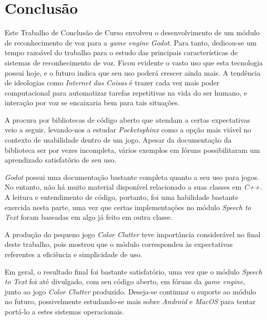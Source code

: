\chapter{Conclusão}
\label{cap:conclusion}

Este Trabalho de Conclusão de Curso envolveu o desenvolvimento de um módulo de reconhecimento de voz para a \textit{game engine} \textit{Godot}. Para tanto, dedicou-se um tempo razoável do trabalho para o estudo das principais características de sistemas de reconhecimento de voz. Ficou evidente o vasto uso que esta tecnologia possui hoje, e o futuro indica que seu uso poderá crescer ainda mais. A tendência de ideologias como \emph{Internet das Coisas} é trazer cada vez mais poder computacional para automatizar tarefas repetitivas na vida do ser humano, e interação por voz se encaixaria bem para tais situações.

A procura por bibliotecas de código aberto que atendam a certas expectativas veio a seguir, levando-nos a estudar \textit{Pocketsphinx} como a opção mais viável no contexto de usabilidade dentro de um jogo. Apesar da documentação da biblioteca ser por vezes incompleta, vários exemplos em fóruns possibilitaram um aprendizado satisfatório de seu uso.

\textit{Godot} possui uma documentação bastante completa quanto a seu uso para jogos. No entanto, não há muito material disponível relacionado a suas classes em \textit{C++}. A leitura e entendimento de código, portanto, foi uma habilidade bastante exercida nesta parte, uma vez que certas implementações no módulo \textit{Speech to Text} foram baseadas em algo já feito em outra classe.

A produção do pequeno jogo \textit{Color Clutter} teve importância considerável no final deste trabalho, pois mostrou que o módulo correspondeu às expectativas referentes a eficiência e simplicidade de uso.

Em geral, o resultado final foi bastante satisfatório, uma vez que o módulo \textit{Speech to Text} foi até divulgado, com seu código aberto, em fóruns da \textit{game engine}, junto ao jogo \textit{Color Clutter} produzido. Deseja-se continuar o suporte ao módulo no futuro, possivelmente estudando-se mais sobre \textit{Android} e \textit{MacOS} para tentar portá-lo a estes sistemas operacionais.
